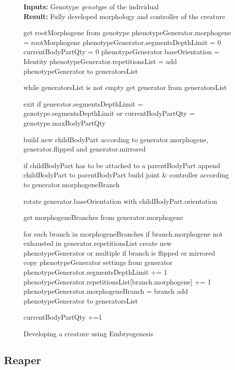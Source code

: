 \documentclass[main]{subfiles}
\begin{document}
\begin{figure}[H]
\caption{Developing a creature using Embryogenesis}
\scriptsize
\textbf{Inputs:} Genotype \textit{genotype} of the individual\\
\textbf{Result:} Fully developed morphology and controller of the creature
\begin{PseudoCode}[otherkeywords={create,add,exit,build,append,place,get,each},emph={rootMorphogene,genome,generatorsList, phenotypeGenerator,segmentsDepthLimit,currentBodyPartQty,childBodyPart,generator,morphogeneBranch,phenotypeGenerators,genotype,parentBodyPart,morphogene,.,maxBodyPartQty,morphogeneBranches,branch,joint,controller,orientation,baseOrientation,repetitionsList},emphstyle={\bfseries\textit}]
get rootMorphogene from genotype
phenotypeGenerator.morphogene = rootMorphogene
phenotypeGenerator.segmentsDepthLimit = 0
currentBodyPartQty = 0
phenotypeGenerator.baseOrientation = Identity
phenotypeGenerator.repetitionsList = {}
add phenotypeGenerator to generatorsList

while generatorsList is not empty
	get generator from generatorsList
	
	exit if generator.segmentsDepthLimit = genotype.segmentsDepthLimit or currentBodyPartQty = genotype.maxBodyPartQty
	
	build new childBodyPart according to generator.morphogene, generator.flipped and generator.mirrored
	
	if childBodyPart has to be attached to a parentBodyPart
		append childBodyPart to parentBodyPart
		build joint & controller according to generator.morphogeneBranch

	rotate generator.baseOrientation with childBodyPart.orientation
	
	get morphogeneBranches from generator.morphogene
	
	for each branch in morphogeneBranches
		if branch.morphogene not exhausted in generator.repetitionsList
			create new phenotypeGenerator or multiple if branch is flipped or mirrored
			copy phenotypeGenerator settings from generator
			phenotypeGenerator.segmentsDepthLimit += 1
			phenotypeGenerator.repetitionsList[branch.morphogene] += 1
			phenotypeGenerator.morphogeneBranch = branch
			add phenotypeGenerator to generatorsList
		
	currentBodyPartQty +=1
\end{PseudoCode}
\label{code:embryogenesis}
\end{figure}

\subsection{Reaper}
\label{subsection:Reaper}
\end{document}
